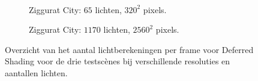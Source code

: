 \begin{figure}[t]
\begin{adjustbox}{minipage=\textwidth, scale=0.55}
\begin{subfigure}[b]{0.8\textwidth}
      \label{fig:cs-lc-frames-deferred:alley-high}
    \end{subfigure}
  \end{adjustbox} \\
  \begin{adjustbox}{minipage=\textwidth, scale=0.55}
    \begin{subfigure}[b]{0.8\textwidth}
      \centering
      \def\svgwidth{\textwidth}
      
      \caption{Ziggurat City: $65$ lichten, $320^2$ pixels.}
      \label{fig:cs-lc-frames-deferred:city-low}
    \end{subfigure}
  \end{adjustbox}\hspace{-0.075\textwidth}  %
  \begin{adjustbox}{minipage=\textwidth, scale=0.55}
    \begin{subfigure}[b]{0.8\textwidth}
      \centering
      \def\svgwidth{\textwidth}
      
      \caption{Ziggurat City: $1170$ lichten, $2560^2$ pixels.}
      \label{fig:cs-lc-frames-deferred:city-high}
    \end{subfigure}
  \end{adjustbox}
  \caption{Overzicht van het aantal lichtberekeningen per frame voor Deferred Shading
           voor de drie testsc\`enes bij verschillende resoluties en aantallen
           lichten.}
  \label{fig:cs-lc-frames-deferred}
\end{figure}

